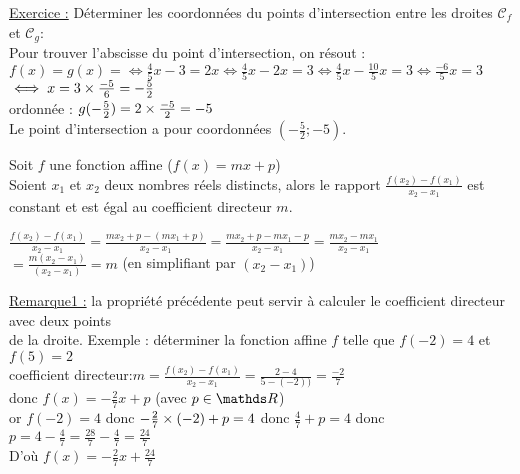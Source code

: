 \documentclass[12 pt,a4paper]{article}
\begin{document}
\newpage

\underline{Exercice :} Déterminer les coordonnées du points d'intersection entre les droites $\mathscr{C}_f$ et $\mathscr{C}_g$:\medskip\\
Pour trouver l'abscisse du point d'intersection, on résout : \medskip\\
$f(x)=g(x)=\iff \frac{4}{5}x-3=2x\iff \frac{4}{5}x-2x=3\iff \frac{4}{5}x-\frac{10}{5}x=3\iff \frac{-6}{5}x=3$\medskip\\
$\iff x=3\times\frac{-5}{6}=-\frac{5}{2}$\medskip\\
ordonnée : $g(-\frac{5}{2})=2\times\frac{-5}{2}=-5$\medskip\\
Le point d'intersection a pour coordonnées $(-\frac{5}{2};-5)$.

\begin{prop} Soit $f$ une fonction affine ($f(x)=mx+p$)\\
Soient $x_1$ et $x_2$ deux nombres réels distincts, alors le rapport $\frac{f(x_2)-f(x_1)}{x_2-x_1}$ est constant et est égal au coefficient directeur $m$.\medskip
\end{prop}

\begin{pf}
$\frac{f(x_2)-f(x_1)}{x_2-x_1}=\frac{mx_2+p-(mx_1+p)}{x_2-x_1}=\frac{mx_2+p-mx_1-p}{x_2-x_1}=\frac{mx_2-mx_1}{x_2-x_1}$\medskip\\
$=\frac{m(x_2-x_1)}{(x_2-x_1)}=m$\hspace{3cm} (en simplifiant par $(x_2-x_1)$)
\end{pf}

\underline{Remarque1 :} la propriété précédente peut servir à calculer le coefficient directeur avec deux points\medskip\\
de la droite. Exemple : déterminer la fonction affine $f$ telle que $f(-2)=4$ et $f(5)=2$\medskip\\
coefficient directeur:$m=\frac{f(x_2)-f(x_1)}{x_2-x_1}=\frac{2-4}{5-(-2))}=\frac{-2}{7}$\medskip\\
donc $f(x)=-\frac{2}{7}x+p$ (avec $p\in\R$)\medskip\\
or $f(-2)=4$ donc $-\frac{2}{7}\times (-2)+p=4$ donc $\frac{4}{7}+p=4$ donc $p=4-\frac{4}{7}=\frac{28}{7}-\frac{4}{7}=\frac{24}{7}$\\D'où $f(x)=-\frac{2}{7}x+\frac{24}{7}$
\end{document}
